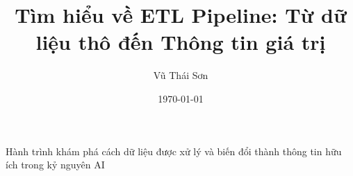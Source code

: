 \documentclass[12pt]{article}
\begin{document}
\title{Tìm hiểu về ETL Pipeline: Từ dữ liệu thô đến Thông tin giá trị}

\author{Vũ Thái Sơn} %
\date{\today}

\maketitle

\begin{center}
\large Hành trình khám phá cách dữ liệu được xử lý và biến đổi thành thông tin hữu ích trong kỷ nguyên AI
\end{center}




% 
\end{document}
